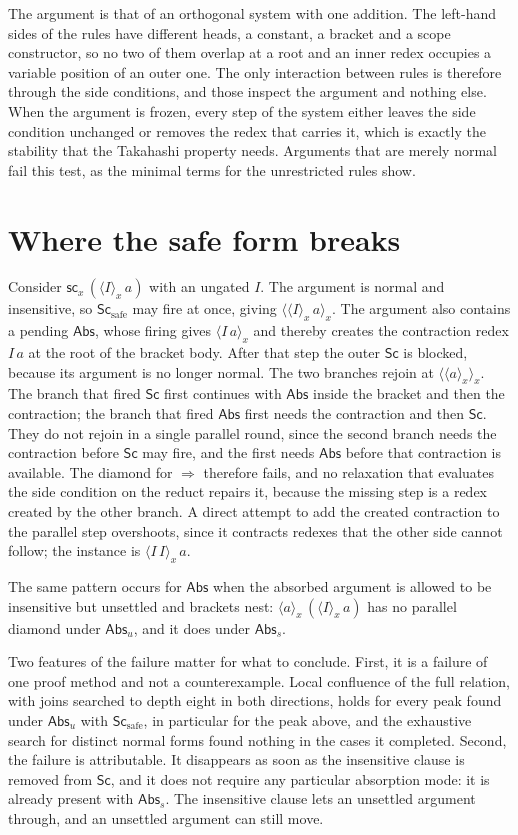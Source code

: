 \documentclass[11pt]{article}
\theoremstyle{definition}
\newcommand{\pa}{\Rightarrow}
\newcommand{\Sc}{\mathsf{Sc}}
\newcommand{\Abs}{\mathsf{Abs}}
\newcommand{\scn}[1]{\mathsf{sc}_{#1}}
\newcommand{\br}[2]{\langle #1\rangle_{#2}}
\begin{document}
The argument is that of an orthogonal system with one addition. The left-hand sides of the rules have different heads, a constant, a bracket and a scope constructor, so no two of them overlap at a root and an inner redex occupies a variable position of an outer one. The only interaction between rules is therefore through the side conditions, and those inspect the argument and nothing else. When the argument is frozen, every step of the system either leaves the side condition unchanged or removes the redex that carries it, which is exactly the stability that the Takahashi property needs. Arguments that are merely normal fail this test, as the minimal terms for the unrestricted rules show.

\section{Where the safe form breaks}

Consider $\scn{x}\,(\br{I}{x}\,a)$ with an ungated $I$. The argument is normal and insensitive, so $\Sc_{\mathrm{safe}}$ may fire at once, giving $\br{\br{I}{x}\,a}{x}$. The argument also contains a pending $\Abs$, whose firing gives $\br{I\,a}{x}$ and thereby creates the contraction redex $I\,a$ at the root of the bracket body. After that step the outer $\Sc$ is blocked, because its argument is no longer normal. The two branches rejoin at $\br{\br{a}{x}}{x}$. The branch that fired $\Sc$ first continues with $\Abs$ inside the bracket and then the contraction; the branch that fired $\Abs$ first needs the contraction and then $\Sc$. They do not rejoin in a single parallel round, since the second branch needs the contraction before $\Sc$ may fire, and the first needs $\Abs$ before that contraction is available. The diamond for $\pa$ therefore fails, and no relaxation that evaluates the side condition on the reduct repairs it, because the missing step is a redex created by the other branch. A direct attempt to add the created contraction to the parallel step overshoots, since it contracts redexes that the other side cannot follow; the instance is $\br{I\,I}{x}\,a$.

The same pattern occurs for $\Abs$ when the absorbed argument is allowed to be insensitive but unsettled and brackets nest: $\br{a}{x}\,(\br{I}{x}\,a)$ has no parallel diamond under $\Abs_u$, and it does under $\Abs_s$.

Two features of the failure matter for what to conclude. First, it is a failure of one proof method and not a counterexample. Local confluence of the full relation, with joins searched to depth eight in both directions, holds for every peak found under $\Abs_u$ with $\Sc_{\mathrm{safe}}$, in particular for the peak above, and the exhaustive search for distinct normal forms found nothing in the cases it completed. Second, the failure is attributable. It disappears as soon as the insensitive clause is removed from $\Sc$, and it does not require any particular absorption mode: it is already present with $\Abs_s$. The insensitive clause lets an unsettled argument through, and an unsettled argument can still move.
\end{document}
